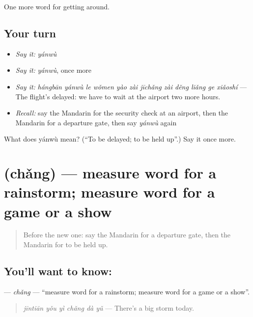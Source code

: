 \begin{grammarlens}[title={What you've built}]
One more word for getting around.
\end{grammarlens}

\subsection*{Your turn}
\begin{itemize}
\raggedright
  \item \emph{Say it:} \emph{yánwù}
  \item \emph{Say it:} \emph{yánwù}, once more
  \item \emph{Say it:} \emph{hángbān yánwù le wǒmen yào zài jīchǎng zài děng liǎng ge xiǎoshí} — The flight's delayed: we have to wait at the airport two more hours.
  \item \emph{Recall:} say the Mandarin for the security check at an airport, then the Mandarin for a departure gate, then say \emph{yánwù} again
\end{itemize}

\begin{tcolorbox}[breakable,colback=teal!4,colframe=teal!35!black,title={Before you move on}]
What does yánwù mean? (\textquotedblleft{}To be delayed; to be held up\textquotedblright{}.) Say it once more.
\end{tcolorbox}
\section[\texorpdfstring{\zh{场} (chǎng)}{场 (chǎng)}]{ (chǎng) — measure word for a rainstorm; measure word for a game or a show}

\label{lesson:ZH-C416-chang}



\begin{quote}
Before the new one: say the Mandarin for a departure gate, then the Mandarin for to be held up.
\end{quote}

\subsection*{You'll want to know: }
\textbf{} — \emph{chǎng} — \textquotedblleft{}measure word for a rainstorm; measure word for a game or a show\textquotedblright{}.

\begin{quote}
\textbf{} \emph{jīntiān yǒu yì chǎng dà yǔ} — There's a big storm today.
\end{quote}

